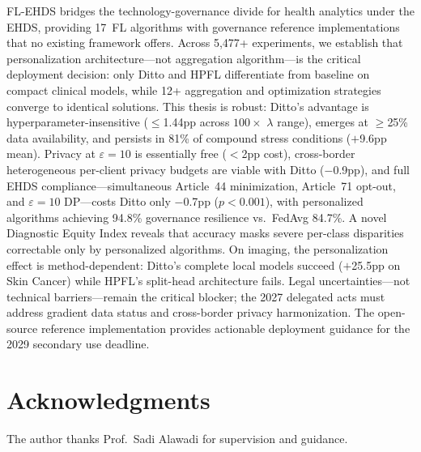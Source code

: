 \documentclass[conference]{IEEEtran}
\begin{document}
FL-EHDS bridges the technology-governance divide for health analytics under the EHDS, providing 17~FL algorithms with governance reference implementations that no existing framework offers. Across 5,477+ experiments, we establish that personalization architecture---not aggregation algorithm---is the critical deployment decision: only Ditto and HPFL differentiate from baseline on compact clinical models, while 12+ aggregation and optimization strategies converge to identical solutions. This thesis is robust: Ditto's advantage is hyperparameter-insensitive ($\leq$1.44pp across $100\times$ $\lambda$ range), emerges at $\geq$25\% data availability, and persists in 81\% of compound stress conditions ($+$9.6pp mean). Privacy at $\varepsilon{=}10$ is essentially free ($<$2pp cost), cross-border heterogeneous per-client privacy budgets are viable with Ditto ($-$0.9pp), and full EHDS compliance---simultaneous Article~44 minimization, Article~71 opt-out, and $\varepsilon{=}10$ DP---costs Ditto only $-$0.7pp ($p{<}0.001$), with personalized algorithms achieving 94.8\% governance resilience vs.\ FedAvg 84.7\%. A novel Diagnostic Equity Index reveals that accuracy masks severe per-class disparities correctable only by personalized algorithms. On imaging, the personalization effect is method-dependent: Ditto's complete local models succeed ($+$25.5pp on Skin Cancer) while HPFL's split-head architecture fails. Legal uncertainties---not technical barriers---remain the critical blocker; the 2027 delegated acts must address gradient data status and cross-border privacy harmonization. The open-source reference implementation provides actionable deployment guidance for the 2029 secondary use deadline.

\section*{Acknowledgments}
The author thanks Prof.~Sadi Alawadi for supervision and guidance.


\end{document}
